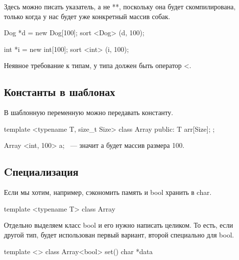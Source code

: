 Здесь можно писать указатель, а не **, поскольку она будет скомпилирована, только когда у нас будет уже конкретный массив собак.

\begin{cppcode}
Dog *d = new Dog[100];
sort <Dog> (d, 100);

int *i = new int[100];
sort <int> (i, 100);
\end{cppcode}

Неявное требование к типам, у типа должен быть оператор <.

\subsection{Константы в шаблонах}

В шаблонную переменную можно передавать константу. 

\begin{cppcode}
template <typename T, size_t Size>
class Array{
    public: 
        T arr[Size];
};
\end{cppcode}

Array <int, 100> a; ~--- значит а будет массив размера 100.

\subsection{Cпециализация}

Если мы хотим, например, сэкономить память и bool хранить в char.

\begin{cppcode}
template <typename T>
class Array{ 

}
\end{cppcode}

Отдельно выделяем класс bool  и его нужно написать целиком. То есть, если другой тип, будет использован первый вариант, второй специально для bool.

\begin{cppcode}
template <>
class Array<bool>{ 
    set(){
    }
    char *data
}
\end{cppcode}



